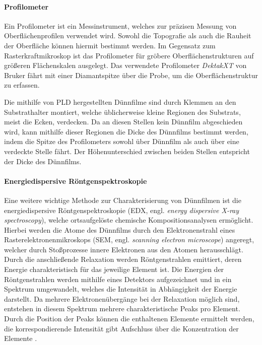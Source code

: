 \paragraph{Profilometer}
Ein Profilometer ist ein Messinstrument, welches zur präzisen Messung von Oberflächenprofilen verwendet wird.
Sowohl die Topografie als auch die Rauheit der Oberfläche können hiermit bestimmt werden.
Im Gegensatz zum Rasterkraftmikroskop ist das Profilometer für gröbere Oberflächenstrukturen auf größeren Flächenskalen
ausgelegt.
Das verwendete Profilometer \textit{DektakXT} von Bruker fährt mit einer Diamantspitze über die Probe, um
die Oberflächenstruktur zu erfassen.

Die mithilfe von PLD hergestellten Dünnfilme sind durch Klemmen an den Substrathalter montiert, welche
üblicherweise kleine Regionen des Substrats, meist die Ecken, verdecken.
Da an diesen Stellen kein Dünnfilm abgeschieden wird, kann mithilfe dieser Regionen die Dicke des
Dünnfilms bestimmt werden, indem die Spitze des Profilometers sowohl über Dünnfilm als auch über eine
verdeckte Stelle fährt.
Der Höhenunterschied zwischen beiden Stellen entspricht der Dicke des Dünnfilms.

\paragraph{Energiedispersive Röntgenspektroskopie}
Eine weitere wichtige Methode zur Charakterisierung von Dünnfilmen ist die energiedispersive Röntgenspektroskopie
(EDX, engl. \textit{energy dispersive X-ray spectroscopy}), welche ortsaufgelöste chemische Kompositionsanalysen
ermöglicht.
Hierbei werden die Atome des Dünnfilms durch den Elektronenstrahl eines Rasterelektronenmikroskops (SEM, engl.
\textit{scanning electron microscope}) angeregt, welcher durch Stoßprozesse innere Elektronen aus den Atomen
herausschlägt.
Durch die anschließende Relaxation werden Röntgenstrahlen emittiert, deren Energie charakteristisch für das jeweilige
Element ist.
Die Energien der Röntgenstrahlen werden mithilfe eines Detektors aufgezeichnet und in ein Spektrum umgewandelt, welches
die Intensität in Abhängigkeit der Energie darstellt.
Da mehrere Elektronenübergänge bei der Relaxation möglich sind, entstehen in diesem Spektrum mehrere charakteristische
Peaks pro Element.
Durch die Position der Peaks können die enthaltenen Elemente ermittelt werden,
die korrespondierende Intensität gibt Aufschluss über die Konzentration der Elemente \autocite{edx}.



